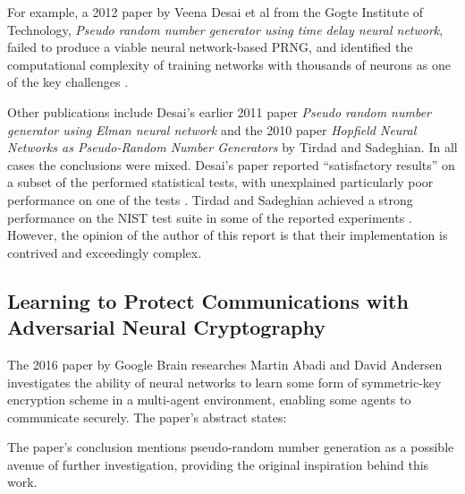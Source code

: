 \documentclass[12pt, titlepage]{report}
\theoremstyle{definition}
\begin{document}
For example, a 2012 paper by Veena Desai et al from the Gogte Institute of Technology, \textit{Pseudo random number generator using time delay neural network}, failed to produce a viable neural network-based PRNG, and identified the computational complexity of training networks with thousands of neurons as one of the key challenges \cite{desai2012pseudo}.

Other publications include Desai's earlier 2011 paper \textit{Pseudo random number generator using Elman neural network} and the 2010 paper \textit{Hopfield Neural Networks as Pseudo-Random Number Generators} by Tirdad and Sadeghian. In all cases the conclusions were mixed. Desai's paper reported ``satisfactory results'' on a subset of the performed statistical tests, with unexplained particularly poor performance on one of the tests \cite{desai2011pseudo}. Tirdad and Sadeghian achieved a strong performance on the NIST test suite in some of the reported experiments \cite{tirdad2010hopfield}. However, the opinion of the author of this report is that their implementation is contrived and exceedingly complex.


\subsection{Learning to Protect Communications with Adversarial Neural Cryptography}
The 2016 paper by Google Brain researches Martin Abadi and David Andersen investigates the ability of neural networks to learn some form of symmetric-key encryption scheme in a multi-agent environment, enabling some agents to communicate securely. The paper's abstract states:

 \cite{abadi2016learning}

The paper's conclusion mentions pseudo-random number generation as a possible avenue of further investigation, providing the original inspiration behind this work.
\end{document}

